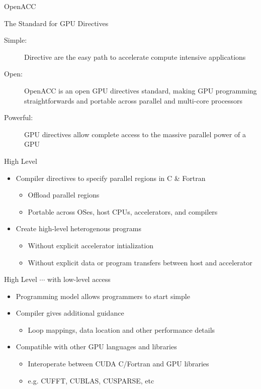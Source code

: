 \documentclass[c,mathserif,compress,xcolor=svgnames]{beamer}
\newenvironment{eblock}[0]
{
\begin{beamerboxesrounded}[upper=uppercol2,lower=lowercol2,shadow=true]}
{\end{beamerboxesrounded}}
\begin{document}
\begin{frame}[allowframebreaks]{\small OpenACC}
  \begin{eblock}{The Standard for GPU Directives}
    \begin{description}
      \item[Simple:] Directive are the easy path to accelerate compute intensive applications
      \item[Open:] OpenACC is an open GPU directives standard, making GPU programming straightforwards and portable across parallel and multi-core processors
      \item[Powerful:] GPU directives allow complete access to the massive parallel power of a GPU
    \end{description}
  \end{eblock}
  \framebreak
  \begin{eblock}{High Level}
    \begin{itemize}
      \item Compiler directives to specify parallel regions in C \& Fortran
      \begin{itemize}
        \item Offload parallel regions
        \item Portable across OSes, host CPUs, accelerators, and compilers
      \end{itemize}
      \item Create high-level heterogenous programs
      \begin{itemize}
        \item Without explicit accelerator intialization
        \item Without explicit data or program transfers between host and accelerator
      \end{itemize}
    \end{itemize}
  \end{eblock}
  \begin{eblock}{High Level $\cdots$ with low-level access}
    \begin{itemize}
      \item Programming model allows programmers to start simple
      \item Compiler gives additional guidance
      \begin{itemize}
        \item Loop mappings, data location and other performance details
      \end{itemize}
      \item Compatible with other GPU languages and libraries
      \begin{itemize}
        \item Interoperate between CUDA C/Fortran and GPU libraries
        \item e.g. CUFFT, CUBLAS, CUSPARSE, etc
      \end{itemize}
    \end{itemize}
  \end{eblock}
\end{frame}
\end{document}
